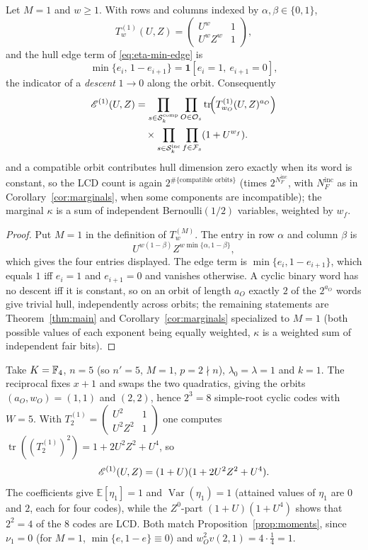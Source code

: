 \begin{proposition}\label{prop:M1}
Let $M=1$ and $w\geq1$. With rows and columns indexed by $\alpha,\beta\in\{0,1\}$,
\[
T^{(1)}_w(U,Z)=
\begin{pmatrix}
U^{w} & 1\\[2pt]
U^{w}Z^{w} & 1
\end{pmatrix},
\]
and the hull edge term of \eqref{eq:eta-min-edge} is
\[
\min\{e_i,\,1-e_{i+1}\}=\mathbf{1}[e_i=1,\ e_{i+1}=0],
\]
the indicator of a \emph{descent} $1\to0$ along the orbit. Consequently
\[
\begin{aligned}
\mathscr E^{(1)}(U,Z)
&=\prod_{s\in\mathcal{S}_k^{\mathrm{comp}}}
  \prod_{O\in\mathcal O_s}
  \operatorname{tr}\!\Bigl(
  T^{(1)}_{w_O}(U,Z)^{a_O}
  \Bigr)\\
&\quad\times
  \prod_{s\in\mathcal{S}_k^{\mathrm{inc}}}
  \prod_{f\in\mathcal F_s}
  (1+U^{w_f}).
\end{aligned}
\]
and a compatible orbit contributes hull dimension zero exactly when its word is
constant, so the LCD count is again $2^{\#\{\text{compatible orbits}\}}$ (times
$2^{N_F^{\mathrm{inc}}}$, with $N_F^{\mathrm{inc}}$ as in
Corollary~\ref{cor:marginals}, when some components are incompatible); the
marginal $\kappa$ is a sum of independent Bernoulli$(1/2)$ variables, weighted
by $w_f$.
\end{proposition}

\begin{proof}
Put $M=1$ in the definition of $T^{(M)}_w$. The entry in row $\alpha$ and
column $\beta$ is
\[
U^{w(1-\beta)}Z^{w\min\{\alpha,1-\beta\}},
\]
which gives the four entries displayed. The edge term is
$\min\{e_i,1-e_{i+1}\}$, which equals $1$ iff $e_i=1$ and $e_{i+1}=0$ and
vanishes otherwise. A cyclic binary word has no descent iff it is constant, so
on an orbit of length $a_O$ exactly $2$ of the $2^{a_O}$ words give trivial
hull, independently across orbits; the remaining statements are
Theorem~\ref{thm:main} and Corollary~\ref{cor:marginals} specialized to $M=1$
(both possible values of each exponent being equally weighted, $\kappa$ is a
weighted sum of independent fair bits).
\end{proof}

\begin{example}\label{ex:M1}
Take $K=\mathbb F_4$, $n=5$ (so $n'=5$, $M=1$, $p=2\nmid n$), $\lambda_0=\lambda=1$
and $k=1$. The reciprocal fixes $x+1$ and swaps the two quadratics, giving the
orbits $(a_O,w_O)=(1,1)$ and $(2,2)$, hence $2^3=8$ simple-root cyclic codes
with $W=5$. With
$T^{(1)}_2=\begin{pmatrix}U^2&1\\ U^2Z^2&1\end{pmatrix}$ one computes
$\operatorname{tr}((T^{(1)}_2)^2)=1+2U^2Z^2+U^4$, so
\[
\mathscr E^{(1)}(U,Z)=(1+U)(1+2U^2Z^2+U^4).
\]
The coefficients give $\mathbb{E}[\eta_1]=1$ and $\operatorname{Var}(\eta_1)=1$
(attained values of $\eta_1$ are $0$ and $2$, each for four codes), while the
$Z^0$-part $(1+U)(1+U^4)$ shows that $2^2=4$ of the $8$ codes are LCD. Both
match Proposition~\ref{prop:moments}, since $\nu_1=0$ (for $M=1$,
$\min\{e,1-e\}\equiv0$) and $w_O^2v(2,1)=4\cdot\tfrac14=1$.
\end{example}

